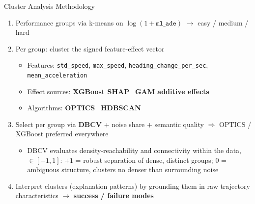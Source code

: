 \begin{frame}[t]{Cluster Analysis Methodology}
  \begin{enumerate}
    \item Performance groups via k-means on $\log(1+\texttt{ml\_ade})$
          $\to$ easy / medium / hard
    \item Per group: cluster the signed feature-effect vector
          \begin{itemize}
            \item Features: \texttt{std\_speed}, \texttt{max\_speed},
                  \texttt{heading\_change\_per\_sec}, \texttt{mean\_acceleration}
            \item Effect sources: \textbf{XGBoost SHAP} \textbar\
                  \textbf{GAM additive effects}
            \item Algorithms: \textbf{OPTICS} \textbar\ \textbf{HDBSCAN}
          \end{itemize}
    \item<2-> Select per group via \textbf{DBCV} + noise share +
          semantic quality
          $\Rightarrow$ OPTICS / XGBoost preferred everywhere
          \begin{itemize}
            \item DBCV evaluates density-reachability and connectivity
                  within the data, $\in [-1, 1]$:
                  $+1$ = robust separation of dense, distinct groups;
                  $0$ = ambiguous structure, clusters no denser than
                  surrounding noise
          \end{itemize}
    \item<3-> Interpret clusters (explanation patterns) by grounding them in raw trajectory characteristics
          $\to$ \textbf{success / failure modes}
  \end{enumerate}
\end{frame}

